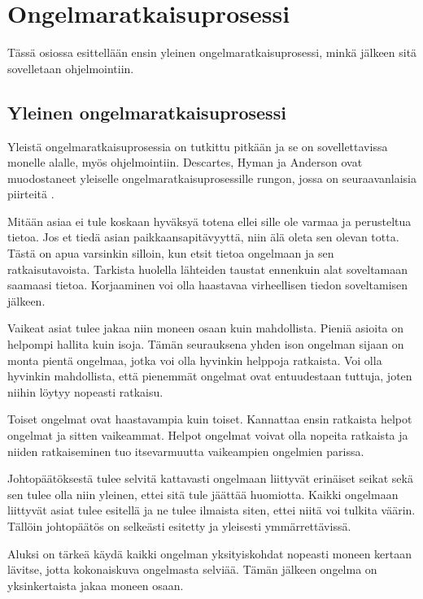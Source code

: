 \section{Ongelmaratkaisuprosessi}

Tässä osiossa esittellään ensin yleinen ongelmaratkaisuprosessi, minkä jälkeen
sitä sovelletaan ohjelmointiin.

\subsection{Yleinen ongelmaratkaisuprosessi}

Yleistä ongelmaratkaisuprosessia on tutkittu pitkään ja se on sovellettavissa
monelle alalle, myös ohjelmointiin. Descartes, Hyman ja Anderson ovat
muodostaneet yleiselle ongelmaratkaisuprosessille rungon, jossa on
seuraavanlaisia piirteitä \cite{Gries:1974:WTI:953057.810447}.

Mitään asiaa ei tule koskaan hyväksyä totena ellei sille ole varmaa ja
perusteltua tietoa. Jos et tiedä asian paikkaansapitävyyttä, niin älä oleta sen
olevan totta. Tästä on apua varsinkin silloin, kun etsit tietoa ongelmaan ja sen
ratkaisutavoista. Tarkista huolella lähteiden taustat ennenkuin alat soveltamaan
saamaasi tietoa. Korjaaminen voi olla haastavaa virheellisen tiedon soveltamisen
jälkeen.

Vaikeat asiat tulee jakaa niin moneen osaan kuin mahdollista. Pieniä asioita on
helpompi hallita kuin isoja. Tämän seurauksena yhden ison ongelman sijaan on
monta pientä ongelmaa, jotka voi olla hyvinkin helppoja ratkaista. Voi olla
hyvinkin mahdollista, että pienemmät ongelmat ovat entuudestaan tuttuja, joten
niihin löytyy nopeasti ratkaisu.

Toiset ongelmat ovat haastavampia kuin toiset. Kannattaa ensin ratkaista helpot
ongelmat ja sitten vaikeammat. Helpot ongelmat voivat olla nopeita ratkaista ja
niiden ratkaiseminen tuo itsevarmuutta vaikeampien ongelmien parissa.

Johtopäätöksestä tulee selvitä kattavasti ongelmaan liittyvät erinäiset seikat
sekä sen tulee olla niin yleinen, ettei sitä tule jäättää huomiotta. Kaikki
ongelmaan liittyvät asiat tulee esitellä ja ne tulee ilmaista siten, ettei niitä
voi tulkita väärin. Tällöin johtopäätös on selkeästi esitetty ja yleisesti
ymmärrettävissä.

Aluksi on tärkeä käydä kaikki ongelman yksityiskohdat nopeasti moneen kertaan
lävitse, jotta kokonaiskuva ongelmasta selviää. Tämän jälkeen ongelma on
yksinkertaista jakaa moneen osaan.

